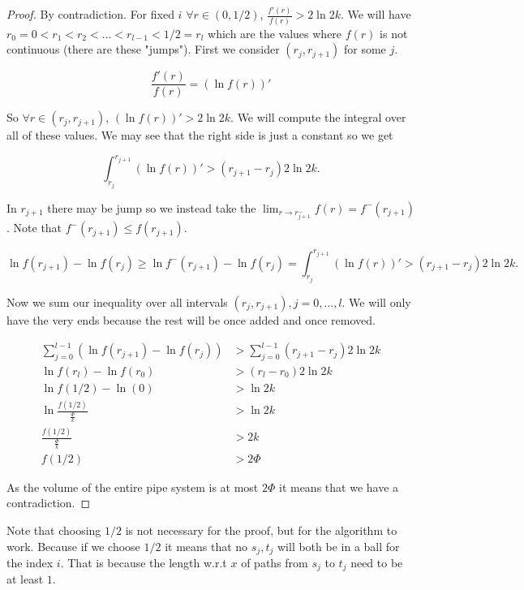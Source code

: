 \begin{proof}
	By contradiction. For fixed $i$ $\forall r \in (0, 1/2)$, $\frac{f'(r)}{f(r)} > 2 \ln 2k$. We will have $r_{0} = 0 < r_{1} < r_{2} < \dots < r_{l-1} < 1/2 = r_{l}$ which are the values where $f(r)$ is not continuous (there are these "jumps"). First we consider $(r_{j}, r_{j+1})$ for some $j$.
	
	$$
	\frac{f'(r)}{f(r)} = \left( \ln f(r)\right)'
	$$
	
	So $\forall r \in (r_{j}, r_{j+1})$, $\left( \ln f(r)\right)' > 2 \ln 2k$. We will compute the integral over all of these values. We may see that the right side is just a constant so we get
	
	$$
	\int_{r_{j}}^{r_{j+1}} \left( \ln f(r)\right)' > (r_{j+1} - r_{j}) 2 \ln 2k.
	$$
	
	In $r_{j+1}$ there may be jump so we instead take the $\lim_{r \to r_{j+1}^{-}} f(r) = f^{-}(r_{j+1})$. Note that $f^{-}(r_{j+1}) \leq f(r_{j+1})$.
	
	$$
	\ln f(r_{j+1}) - \ln f(r_{j}) \geq \ln f^{-}(r_{j+1}) - \ln f(r_{j}) = \int_{r_{j}}^{r_{j+1}} \left( \ln f(r)\right)' > (r_{j+1} - r_{j}) 2 \ln 2k.
	$$
	
	Now we sum our inequality over all intervals $(r_{j}, r_{j+1}), j = 0, \dots, l$. We will only have the very ends because the rest will be once added and once removed.
	
	$$
	\begin{aligned}
		\sum_{j = 0}^{l-1} \left( \ln f(r_{j+1}) - \ln f(r_{j}) \right) &> \sum_{j = 0}^{l-1} (r_{j+1} - r_{j}) 2 \ln 2k\\
		\ln f(r_{l}) - \ln f(r_{0}) &> (r_{l} - r_{0}) 2 \ln 2k\\
		\ln f(1/2) - \ln (0) &> \ln 2k\\
		\ln \frac{f(1/2)}{\frac{\Phi}{k}} &> \ln 2k\\
		\frac{f(1/2)}{\frac{\Phi}{k}} &> 2k\\
		f(1/2) &> 2 \Phi
	\end{aligned}
	$$
	
	As the volume of the entire pipe system is at most $2 \Phi$ it means that we have a contradiction.
\end{proof}

Note that choosing $1/2$ is not necessary for the proof, but for the algorithm to work. Because if we choose $1/2$ it means that no $s_{j}, t_{j}$ will both be in a ball for the index $i$. That is because the length w.r.t $x$ of paths from $s_{j}$ to $t_{j}$ need to be at least $1$.

